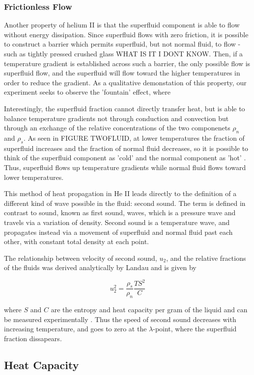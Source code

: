 \subsubsection{Frictionless Flow}
Another property of helium II is that the superfluid component is able
to flow without energy dissipation. Since superfluid flows with zero
friction, it is possible to construct a barrier which permits
superfluid, but not normal fluid, to flow - such as tightly pressed
crushed glass WHAT IS IT I DONT KNOW. Then, if a temperature gradient
is established across such a barrier, the only possible flow is
superfluid flow, and the superfluid will flow toward the higher
temperatures in order to reduce the gradient. As a qualitative
demonstation of this property, our experiment seeks to observe the
'fountain' effect, where



Interestingly, the superfluid fraction cannot directly transfer heat,
but is able to balance temperature gradients not through conduction
and convection but through an exchange of the relative concentrations
of the two componenets $\rho_n$ and $\rho_s$. As seen in FIGURE
TWOFLUID, at lower temperatures the fraction of superfluid increases
and the fraction of normal fluid decreases, so it is possible to think
of the superfluid component as 'cold' and the normal component as
'hot' \cite{atkins}. Thus, superfluid flows up temperature gradients
while normal fluid flows toward lower temperatures.

This method of heat propagation in He II leads directly to the
definition of a different kind of wave possible in the fluid: second
sound. The term is defined in contrast to sound, known as first sound,
waves, which is a pressure wave and travels via a variation of
density. Second sound is a temperature wave, and propagates instead
via a movement of superfluid and normal fluid past each other, with
constant total density at each point. 

The relationship between velocity of second sound, $u_2$, and the
relative fractions of the fluids was derived analytically by Landau
and is given by

\begin{equation}
u_2^2 = \frac{\rho_s}{\rho_n}\frac{T S^2}{C}
\end{equation}

where $S$ and $C$ are the entropy and heat capacity per gram of the
liquid and can be measured experimentally \cite{atkins}. Thus the
speed of second sound decreases with increasing temperature, and goes
to zero at the $\lambda$-point, where the superfluid fraction
dissapears.

\subsection{Heat Capacity}
